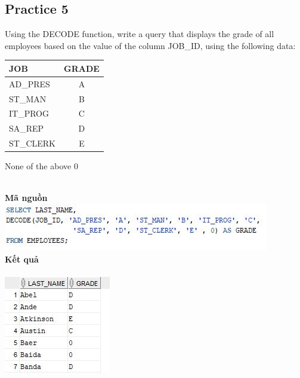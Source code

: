 \documentclass[12pt,a4paper]{report}
\begin{document}
\subsection{Practice 5}
\begin{boxedminipage}[t]{15.5cm}
	Using the DECODE function, write a query that displays the grade of all employees
	based on the value of the column JOB\_ID, using the following data:
	\begin{center}
	\begin{tabular}{|l|c|}
		\hline
		JOB & GRADE \\
		\hline
		AD\_PRES & A \\
		\hline
		ST\_MAN & B \\
		\hline
		IT\_PROG & C \\
		\hline
		SA\_REP & D \\
		\hline
		ST\_CLERK & E \\
		\hline
	\end{tabular}
	\end{center}
	None of the above 0
\end{boxedminipage}
\newline
\\
\textbf{Mã nguồn}
\\
\newline
\includegraphics[scale=1]{55.jpg}\\
\textbf{Kết quả}\\\\
\includegraphics[scale=1]{k55.jpg}
\end{document}

